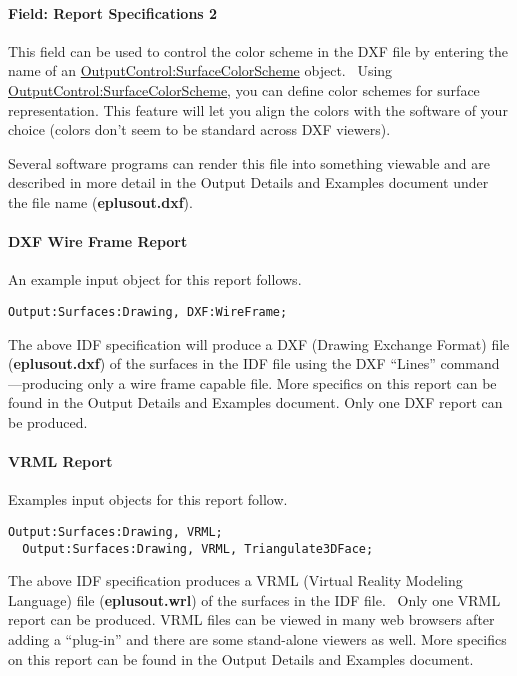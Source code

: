 \paragraph{Field: Report Specifications 2}\label{field-report-specifications-2}

This field can be used to control the color scheme in the DXF file by entering the name of an \hyperref[outputcontrolsurfacecolorscheme]{OutputControl:SurfaceColorScheme} object.~ Using \hyperref[outputcontrolsurfacecolorscheme]{OutputControl:SurfaceColorScheme}, you can define color schemes for surface representation. This feature will let you align the colors with the software of your choice (colors don't seem to be standard across DXF viewers).

Several software programs can render this file into something viewable and are described in more detail in the Output Details and Examples document under the file name (\textbf{eplusout.dxf}).

\paragraph{DXF Wire Frame Report}\label{dxf-wire-frame-report}

An example input object for this report follows.

\begin{lstlisting}
Output:Surfaces:Drawing, DXF:WireFrame;
\end{lstlisting}

The above IDF specification will produce a DXF (Drawing Exchange Format) file (\textbf{eplusout.dxf}) of the surfaces in the IDF file using the DXF ``Lines'' command---producing only a wire frame capable file. More specifics on this report can be found in the Output Details and Examples document. Only one DXF report can be produced.

\paragraph{VRML Report}\label{vrml-report}

Examples input objects for this report follow.

\begin{lstlisting}
Output:Surfaces:Drawing, VRML;
  Output:Surfaces:Drawing, VRML, Triangulate3DFace;
\end{lstlisting}

The above IDF specification produces a VRML (Virtual Reality Modeling Language) file (\textbf{eplusout.wrl}) of the surfaces in the IDF file.~ Only one VRML report can be produced. VRML files can be viewed in many web browsers after adding a ``plug-in'' and there are some stand-alone viewers as well. More specifics on this report can be found in the Output Details and Examples document.

